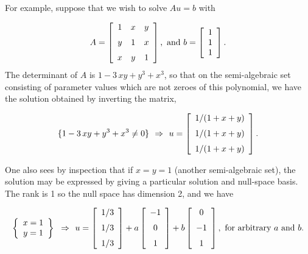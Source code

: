 For example, suppose that we wish to solve $Au = b$ with

\[
A=\left [\begin {array}{ccc} 
1&x&y\\\noalign{\medskip}
y&1&x\\\noalign{\medskip}
x&y&1\end {array}\right ],~ \mbox{and}~
b=\left [\begin {array}{c} 1\\1\\1 \end {array}\right ].
\]
The determinant of $A$ is $ 1-3\,xy+{y}^{3}+{x}^{3} $, so that on the semi-algebraic set consisting of parameter values which are not zeroes of this
polynomial, we have the solution obtained by inverting the matrix,

\[
\{1-3\,xy+{y}^{3}+{x}^{3} \ne 0\}\implies 
u = \left [\begin {array}{c} 
1/(1+x+y)\\\noalign{\medskip}
1/(1+x+y)\\\noalign{\medskip}
1/(1+x+y)
\end {array}\right ].
\]


One also sees by inspection that if $x = y = 1 $ (another semi-algebraic set),
the solution may be expressed by giving a particular solution
and null-space basis.  The rank is 1 so the null space has dimension 2,
and we have 

\[
\breg x = 1\\ y = 1\ereg \implies
u = \left [\begin {array}{c} 1/3\\\noalign{\medskip}1/3\\\noalign{\medskip}1/3 \end {array}\right ]
+ a \left [\begin {array}{c} -1\\\noalign{\medskip}0\\\noalign{\medskip}1 \end {array}\right ]
+ b \left [\begin {array}{c} 0\\\noalign{\medskip}-1\\\noalign{\medskip}1 \end {array}\right ] , 
\for \mbox{arbitrary}~ a \und b.
\]

